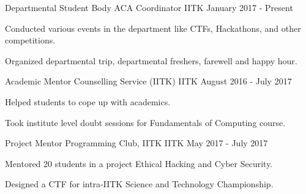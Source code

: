 \documentclass[12pt, a4paper]{awesome-cv}
\begin{document}
\begin{cventries}

  \cventry
  {Departmental Student Body}
  {ACA Coordinator}
  {IITK}
  {January 2017 - Present}
  {
    \begin{cvitems}
    \item Conducted various events in the department like CTFs, Hackathons, and other competitions.
    \item Organized departmental trip, departmental freshers, farewell and happy hour.
    \end{cvitems}
  }
    \vspace{0.2cm}
  \cventry
    {Academic Mentor}
    {Counselling Service (IITK)}
    {IITK}
    {August 2016 - July 2017}
    {
      \begin{cvitems}
        \item {Helped students to cope up with academics.}
        \item {Took institute level doubt sessions for Fundamentals of Computing course.}
      \end{cvitems}
    }
    \vspace{0.2cm}
  \cventry
  {Project Mentor}
  {Programming Club, IITK}
  {IITK}
  {May 2017 - July 2017}
  {
    \begin{cvitems}
    \item Mentored 20 students in a project Ethical Hacking and Cyber Security.
    \item Designed a CTF for intra-IITK Science and Technology Championship.
    \end{cvitems}
  }
\end{cventries}

\end{document}
